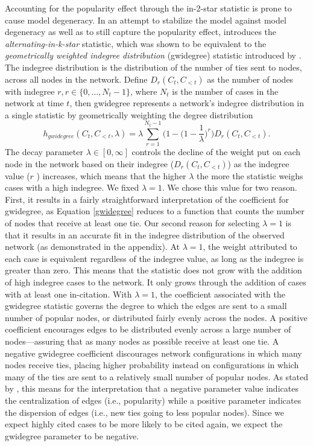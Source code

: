 \documentclass[headsepline=true, abstracton]{scrartcl}
\begin{document}
Accounting for the popularity effect through the in-2-star statistic is prone to cause model degeneracy. In an attempt to stabilize the model against model degeneracy as well as to still capture the popularity effect, \citet{SnijdersTomA.B..2006} introduces the \textit{alternating-in-k-star} statistic, which was shown to be equivalent to the \textit{geometrically weighted indegree distribution} (gwidegree) statistic introduced by \citet{hunter2006inference}. The indegree distribution is the distribution of the number of ties sent to nodes, across all nodes in the network. Define $D_r(C_t, C_{<t})$ as the number of nodes with indegree $r, r \in \{0, \dots , N_t -1 \}$, where $N_t$ is the number of cases in the network at time $t$, then gwidegree represents a network's indegree distribution in a single statistic by geometrically weighting the degree distribution
\begin{equation}
h_{gwidegree}(C_{t}, C_{<t}, \lambda)= \lambda \sum_{r=1}^{N_t-1}\biggl(1-\bigl(1-\frac{1}{\lambda}\bigr)^r\biggr)D_r(C_t, C_{<t}). 
\label{gwidegree}
\end{equation}
The decay parameter $\lambda \in [0, \infty ]$ controls the decline of the weight put on each node in the network based on their indegree ($D_r(C_t, C_{<t})$) as the indegree value ($r$ ) increases, which means that the higher $\lambda$ the more the statistic weighs cases with a high indegree. We fixed $\lambda=1$. We chose this value for two reason. First, it results in a fairly straightforward interpretation of the coefficient for gwidegree, as Equation \ref{gwidegree} reduces to a function that counts the number of nodes that receive at least one tie. Our second reason for selecting $\lambda=1$ is that it results in an accurate fit in the indegree distribution of the observed network (as demonstrated in the appendix). At $\lambda=1$, the weight attributed to each case is equivalent regardless of the indegree value, as long as the indegree is greater than zero. This means that the statistic does not grow with the addition of high indegree cases to the network. It only grows through the addition of cases with at least one in-citation. With  $\lambda=1$, the coefficient associated with the gwidegree statistic governs the degree to which the edges are sent to a small number of popular nodes, or distributed fairly evenly across the nodes. A positive coefficient encourages edges to be distributed evenly across a large number of nodes---assuring that as many nodes as possible receive at least one tie. A negative gwidegree coefficient discourages network configurations in which many nodes receive ties, placing higher probability instead on configurations in which many of the ties are sent to a relatively small number of popular nodes. As stated by \citet{Levy2016}, this means for the interpretation that a negative parameter value indicates the centralization of edges (i.e., popularity) while a positive parameter indicates the dispersion of edges (i.e., new ties going to less popular nodes).  Since we expect highly cited cases to be more likely to be cited again, we expect the gwidegree parameter to be negative.
\end{document}
